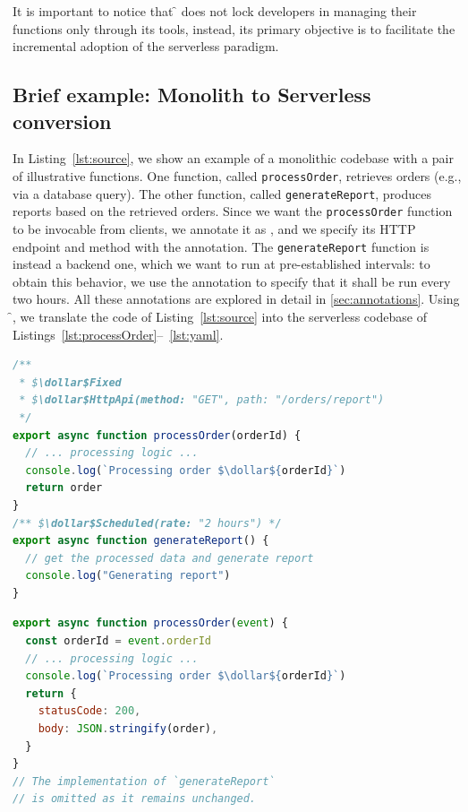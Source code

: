 It is important to notice that \f{} does not lock developers in managing their
functions only through its tools, instead, its primary objective is to facilitate
the incremental adoption of the serverless paradigm.

\subsection{Brief example: Monolith to Serverless conversion}
\label{sec:example}

In Listing~\ref{lst:source}, we show an example of a monolithic codebase with a
pair of illustrative functions. One function, called \verb|processOrder|,
retrieves orders (e.g., via a database query). The other function, called
\verb|generateReport|, produces reports based on the retrieved orders. Since
we want the \verb|processOrder| function to be invocable from clients, we
annotate it as , and we specify its HTTP endpoint and method
with the  annotation. The \verb|generateReport| function
is instead a backend one, which we want to run at pre-established intervals: to
obtain this behavior, we use the  annotation to specify
that it shall be run every two hours.
All these annotations are explored in detail in \cref{sec:annotations}.
Using \f{}, we translate the code of Listing~\ref{lst:source} into the
serverless codebase of Listings~\ref{lst:processOrder}--~\ref{lst:yaml}.

\begin{lstlisting}[language=javascript, caption={Source Code.}, label=lst:source]
/**
 * $\dollar$Fixed
 * $\dollar$HttpApi(method: "GET", path: "/orders/report")
 */
export async function processOrder(orderId) {
  // ... processing logic ...
  console.log(`Processing order $\dollar${orderId}`)
  return order
}
/** $\dollar$Scheduled(rate: "2 hours") */
export async function generateReport() {
  // get the processed data and generate report
  console.log("Generating report")
}
\end{lstlisting}

\begin{lstlisting}[language=javascript, caption={Generated Code.}, label=lst:processOrder]
export async function processOrder(event) {
  const orderId = event.orderId
  // ... processing logic ...
  console.log(`Processing order $\dollar${orderId}`)
  return {
    statusCode: 200,
    body: JSON.stringify(order),
  }
}
// The implementation of `generateReport`
// is omitted as it remains unchanged.
\end{lstlisting}

